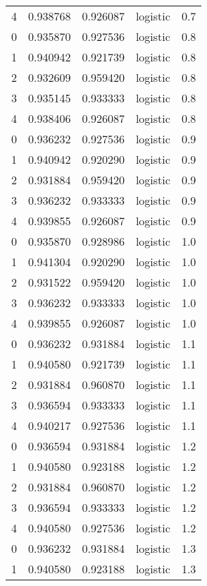 \begin{tabular}{rrrlr}
     4 & 0.938768 & 0.926087 & logistic &        0.7 \\
     0 & 0.935870 & 0.927536 & logistic &        0.8 \\
     1 & 0.940942 & 0.921739 & logistic &        0.8 \\
     2 & 0.932609 & 0.959420 & logistic &        0.8 \\
     3 & 0.935145 & 0.933333 & logistic &        0.8 \\
     4 & 0.938406 & 0.926087 & logistic &        0.8 \\
     0 & 0.936232 & 0.927536 & logistic &        0.9 \\
     1 & 0.940942 & 0.920290 & logistic &        0.9 \\
     2 & 0.931884 & 0.959420 & logistic &        0.9 \\
     3 & 0.936232 & 0.933333 & logistic &        0.9 \\
     4 & 0.939855 & 0.926087 & logistic &        0.9 \\
     0 & 0.935870 & 0.928986 & logistic &        1.0 \\
     1 & 0.941304 & 0.920290 & logistic &        1.0 \\
     2 & 0.931522 & 0.959420 & logistic &        1.0 \\
     3 & 0.936232 & 0.933333 & logistic &        1.0 \\
     4 & 0.939855 & 0.926087 & logistic &        1.0 \\
     0 & 0.936232 & 0.931884 & logistic &        1.1 \\
     1 & 0.940580 & 0.921739 & logistic &        1.1 \\
     2 & 0.931884 & 0.960870 & logistic &        1.1 \\
     3 & 0.936594 & 0.933333 & logistic &        1.1 \\
     4 & 0.940217 & 0.927536 & logistic &        1.1 \\
     0 & 0.936594 & 0.931884 & logistic &        1.2 \\
     1 & 0.940580 & 0.923188 & logistic &        1.2 \\
     2 & 0.931884 & 0.960870 & logistic &        1.2 \\
     3 & 0.936594 & 0.933333 & logistic &        1.2 \\
     4 & 0.940580 & 0.927536 & logistic &        1.2 \\
     0 & 0.936232 & 0.931884 & logistic &        1.3 \\
     1 & 0.940580 & 0.923188 & logistic &        1.3 \\

\end{tabular}
